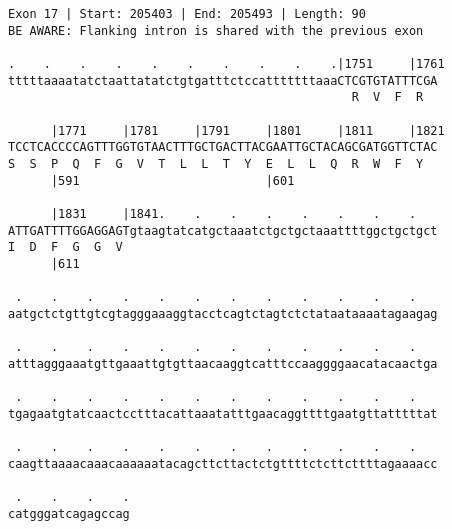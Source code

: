 \documentclass{article}
\begin{document}
\begin{Verbatim}
Exon 17 | Start: 205403 | End: 205493 | Length: 90
BE AWARE: Flanking intron is shared with the previous exon
 
.    .    .    .    .    .    .    .    .    .|1751     |1761
tttttaaaatatctaattatatctgtgatttctccatttttttaaaCTCGTGTATTTCGA
                                                R  V  F  R  
  
      |1771     |1781     |1791     |1801     |1811     |1821
TCCTCACCCCAGTTTGGTGTAACTTTGCTGACTTACGAATTGCTACAGCGATGGTTCTAC
S  S  P  Q  F  G  V  T  L  L  T  Y  E  L  L  Q  R  W  F  Y  
      |591                          |601                    
  
      |1831     |1841.    .    .    .    .    .    .    .   
ATTGATTTTGGAGGAGTgtaagtatcatgctaaatctgctgctaaattttggctgctgct
I  D  F  G  G  V                                            
      |611                                                  
  
 .    .    .    .    .    .    .    .    .    .    .    .   
aatgctctgttgtcgtagggaaaggtacctcagtctagtctctataataaaatagaagag
  
 .    .    .    .    .    .    .    .    .    .    .    .   
atttagggaaatgttgaaattgtgttaacaaggtcatttccaaggggaacatacaactga
  
 .    .    .    .    .    .    .    .    .    .    .    .   
tgagaatgtatcaactcctttacattaaatatttgaacaggttttgaatgttatttttat
  
 .    .    .    .    .    .    .    .    .    .    .    .   
caagttaaaacaaacaaaaaatacagcttcttactctgttttctcttcttttagaaaacc
  
 .    .    .    .
catgggatcagagccag
\end{Verbatim}
\newpage
\end{document}
